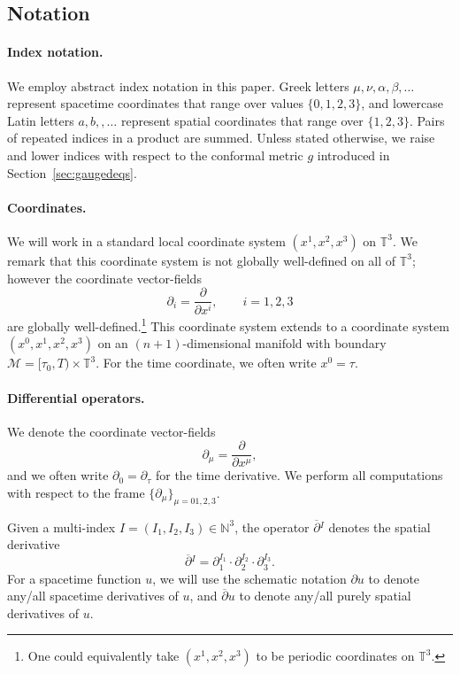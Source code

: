 \documentclass{article}
\newcommand{\NN}{\mathbb{N}}
\newcommand{\TT}{\mathbb{T}}
\newcommand{\mc}{\mathcal}
\newcommand{\ol}{\overline}
\newcommand{\pa}{\partial}
\begin{document}
\subsection{Notation}\label{sec:prelims.subsec:notation}
\paragraph*{Index notation.}
We employ abstract index notation in this paper. Greek letters $\mu,\nu,\alpha,\beta,\dots $ represent spacetime coordinates that range over values $\{0,1,2,3\}$, and lowercase Latin letters $a,b,,\dots$ represent spatial coordinates that range over $\{1,2,3\}$. Pairs of repeated indices in a product are summed. Unless stated otherwise, we raise and lower indices with respect to the conformal metric $g$ introduced in Section~\ref{sec:gaugedeqs}.

\paragraph*{Coordinates.}
We will work in a standard local coordinate system $(x^1,x^2,x^3)$ on $\TT^3$. We remark that this coordinate system is not globally well-defined on all of $\TT^3$; however the coordinate vector-fields
\begin{equation}
    \pa_i = \frac{\pa}{\pa x^i},\qquad i=1,2,3
\end{equation}
are globally well-defined.\footnote{One could equivalently take $(x^1,x^2,x^3)$ to be periodic coordinates on $\TT^3$.} This coordinate system extends to a coordinate system $(x^0,x^1,x^2,x^3)$ on an $(n+1)$-dimensional manifold with boundary $\mc{M} = [\tau_0,T) \times \TT^3$. For the time coordinate, we often write $x^0 = \tau$.

\paragraph*{Differential operators.}
We denote the coordinate vector-fields
\begin{equation}
    \pa_\mu = \frac{\pa}{\pa x^\mu},
\end{equation}
and we often write $\pa_0 = \pa_\tau$ for the time derivative. We perform all computations with respect to the frame $\{\pa_\mu\}_{\mu=01,2,3}$.

Given a multi-index $I = (I_1,I_2,I_3) \in \NN^3$, the operator $\ol{\pa}{}^I$ denotes the spatial derivative
\begin{equation}
    \ol{\pa}{}^I = \pa_1^{I_1}\cdot \pa_2^{I_2}\cdot \pa_3^{I_3}.
\end{equation}
For a spacetime function $u$, we will use the schematic notation $\pa u$ to denote any/all spacetime derivatives of $u$, and $\ol{\pa} u$ to denote any/all purely spatial derivatives of $u$.
\end{document}
